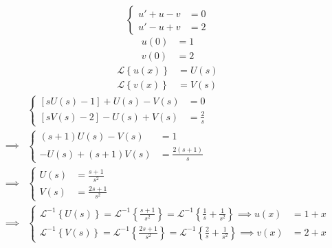\documentclass[11pt,a4paper,titlepage,final]{article}
\begin{document}
\begin{exercise*}{12.12} \[
	\begin{cases}
		u'+u-v &=0 \\
		u'-u+v &= 2	
	\end{cases}
	\]
	\begin{align*}
	u(0) &= 1 \\
	v(0) &= 2
	\end{align*}
	\tcblower
	\begin{align*}
	\mathscr L\left\lbrace u(x) \right\rbrace &= U(s) \\
	\mathscr L\left\lbrace v(x) \right\rbrace &= V(s)
	\end{align*}
	\begin{align*}
&	\begin{cases}
	\left[sU(s)-1\right]+U(s)-V(s) &=0 \\
	\left[sV(s)-2\right]-U(s)+V(s) &= \frac{2}{s}
	\end{cases} \\ \implies& \begin{cases}
	(s+1)U(s) - V(s) &= 1 \\
	-U(s) + (s+1)V(s) &= \frac{2(s+1)}{s}
	\end{cases} \\ \implies &
	\begin{cases}
	U(s) &= \frac{s+1}{s^2} \\ V(s) &= \frac{2s+1}{s^2}
	\end{cases} \\ \implies&
	\begin{cases}
	\mathscr L^{-1} \left\lbrace U(s) \right\rbrace = \mathscr L^{-1} \left\lbrace \frac{s+1}{s^2} \right\rbrace = \mathscr L^{-1} \left\lbrace \frac{1}{s} +\frac{1}{s^2}\right\rbrace \implies u(x) &= 1+x \\
	\mathscr L^{-1}\left\lbrace V(s) \right\rbrace =  \mathscr L ^{-1}\left\lbrace \frac{2s+1}{s^2} \right\rbrace =  \mathscr L ^{-1}\left\lbrace \frac{2}{s} + \frac{1}{s^2} \right\rbrace \implies v(x) &= 2+x
	\end{cases}
	\end{align*}
	\end{exercise*}
\end{document}
